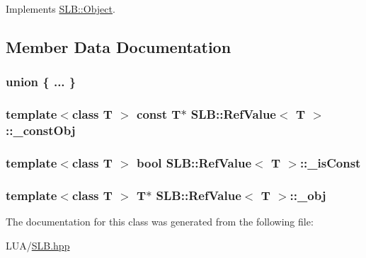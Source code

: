 Implements \hyperlink{classSLB_1_1Object_a3dddf6a764c19ed37f6af797f0b0b453}{S\+L\+B\+::\+Object}.



\subsection{Member Data Documentation}
\subsubsection[{\texorpdfstring{"@1}{@1}}]{\setlength{\rightskip}{0pt plus 5cm}union \{ ... \} \hspace{0.3cm}{\ttfamily [private]}}\hypertarget{classSLB_1_1RefValue_a19c062a6c761c92eb631b373bf2d509e}{}\label{classSLB_1_1RefValue_a19c062a6c761c92eb631b373bf2d509e}
\subsubsection[{\texorpdfstring{\+\_\+const\+Obj}{_constObj}}]{\setlength{\rightskip}{0pt plus 5cm}template$<$class T $>$ const T$\ast$ {\bf S\+L\+B\+::\+Ref\+Value}$<$ T $>$\+::\+\_\+const\+Obj}\hypertarget{classSLB_1_1RefValue_a941262995dc0684ac8b66bdcaace44c1}{}\label{classSLB_1_1RefValue_a941262995dc0684ac8b66bdcaace44c1}
\subsubsection[{\texorpdfstring{\+\_\+is\+Const}{_isConst}}]{\setlength{\rightskip}{0pt plus 5cm}template$<$class T $>$ bool {\bf S\+L\+B\+::\+Ref\+Value}$<$ T $>$\+::\+\_\+is\+Const\hspace{0.3cm}{\ttfamily [private]}}\hypertarget{classSLB_1_1RefValue_ab2962578f1a0c8d9a5941ec6f05fc31c}{}\label{classSLB_1_1RefValue_ab2962578f1a0c8d9a5941ec6f05fc31c}
\subsubsection[{\texorpdfstring{\+\_\+obj}{_obj}}]{\setlength{\rightskip}{0pt plus 5cm}template$<$class T $>$ T$\ast$ {\bf S\+L\+B\+::\+Ref\+Value}$<$ T $>$\+::\+\_\+obj}\hypertarget{classSLB_1_1RefValue_ad2d7be8cda83586403d85e69e30e036f}{}\label{classSLB_1_1RefValue_ad2d7be8cda83586403d85e69e30e036f}


The documentation for this class was generated from the following file\+:\begin{DoxyCompactItemize}
\item 
L\+U\+A/\hyperlink{SLB_8hpp}{S\+L\+B.\+hpp}\end{DoxyCompactItemize}
